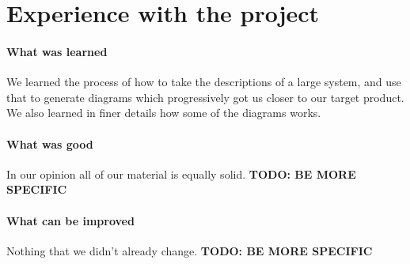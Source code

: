 \section{Experience with the project}
\paragraph{What was learned}
We learned the process of how to take the descriptions of a large system, and use that to generate diagrams which progressively got us closer to our target product. We also learned in finer details how some of the diagrams works. 

\paragraph{What was good}
In our opinion all of our material is equally solid. 
\textbf{TODO: BE MORE SPECIFIC}

\paragraph{What can be improved}
Nothing that we didn't already change.
\textbf{TODO: BE MORE SPECIFIC}
